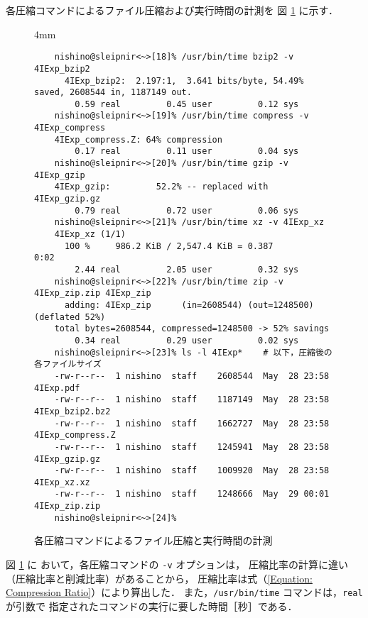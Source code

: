 \documentclass[a4j]{jreport}
\begin{document}
\begin{enumerate}[labelindent=\parindent, leftmargin=*, label=課題 \arabic*）]
	各圧縮コマンドによるファイル圧縮および実行時間の計測を
	図 \ref{Figure: /usr/bin/time bzip2, compress, gzip, xz, zip} に示す．

	  \begin{figure}[H]
	    \centering
	      \begin{screen}[3]
	        \setlength{\baselineskip} {4mm}
	        \begin{verbatim}
	nishino@sleipnir<~>[18]% /usr/bin/time bzip2 -v 4IExp_bzip2
	  4IExp_bzip2:  2.197:1,  3.641 bits/byte, 54.49% saved, 2608544 in, 1187149 out.
		0.59 real         0.45 user         0.12 sys
	nishino@sleipnir<~>[19]% /usr/bin/time compress -v 4IExp_compress
	4IExp_compress.Z: 64% compression
		0.17 real         0.11 user         0.04 sys
	nishino@sleipnir<~>[20]% /usr/bin/time gzip -v 4IExp_gzip
	4IExp_gzip:         52.2% -- replaced with 4IExp_gzip.gz
		0.79 real         0.72 user         0.06 sys
	nishino@sleipnir<~>[21]% /usr/bin/time xz -v 4IExp_xz
	4IExp_xz (1/1)
	  100 %     986.2 KiB / 2,547.4 KiB = 0.387                   0:02
		2.44 real         2.05 user         0.32 sys
	nishino@sleipnir<~>[22]% /usr/bin/time zip -v 4IExp_zip.zip 4IExp_zip
	  adding: 4IExp_zip      (in=2608544) (out=1248500) (deflated 52%)
	total bytes=2608544, compressed=1248500 -> 52% savings
		0.34 real         0.29 user         0.02 sys
	nishino@sleipnir<~>[23]% ls -l 4IExp*    # 以下，圧縮後の各ファイルサイズ
	-rw-r--r--  1 nishino  staff    2608544  May  28 23:58  4IExp.pdf
	-rw-r--r--  1 nishino  staff    1187149  May  28 23:58  4IExp_bzip2.bz2
	-rw-r--r--  1 nishino  staff    1662727  May  28 23:58  4IExp_compress.Z
	-rw-r--r--  1 nishino  staff    1245941  May  28 23:58  4IExp_gzip.gz
	-rw-r--r--  1 nishino  staff    1009920  May  28 23:58  4IExp_xz.xz
	-rw-r--r--  1 nishino  staff    1248666  May  29 00:01  4IExp_zip.zip
	nishino@sleipnir<~>[24]%
	        \end{verbatim}%
	        \vspace*{-18pt}
	      \end{screen}
	      \caption{各圧縮コマンドによるファイル圧縮と実行時間の計測}
	      \label{Figure: /usr/bin/time bzip2, compress, gzip, xz, zip}
	  \end{figure}

	図 \ref{Figure: /usr/bin/time bzip2, compress, gzip, xz, zip} に
	おいて，各圧縮コマンドの \texttt{-v} オプションは，
	圧縮比率の計算に違い（圧縮比率と削減比率）があることから，
	圧縮比率は式（\ref{Equation: Compression Ratio}）により算出した．
	また，\texttt{/usr/bin/time} コマンドは，\texttt{real} が引数で
	指定されたコマンドの実行に要した時間［秒］である．


\end{enumerate}
\end{document}
